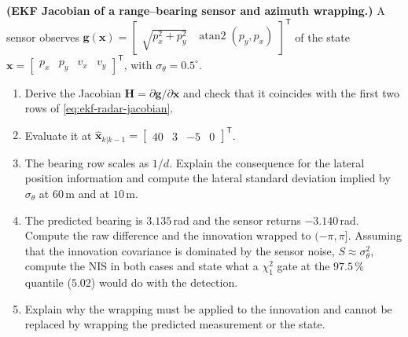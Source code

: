 \documentclass[graybox,envcountchap]{style/SNmono}
\begin{document}
\begin{prob}\label{prob:ch03:5}
\textbf{(EKF Jacobian of a range--bearing sensor and azimuth wrapping.)} A sensor observes $\mathbf{g}(\mathbf{x})=\begin{bmatrix}\sqrt{p_x^{2}+p_y^{2}} & \operatorname{atan2}(p_y,p_x)\end{bmatrix}^{\mathsf T}$ of the state $\mathbf{x}=\begin{bmatrix}p_x&p_y&v_x&v_y\end{bmatrix}^{\mathsf T}$, with $\sigma_\theta=0.5^{\circ}$.
\begin{enumerate}
\item[(a)] Derive the Jacobian $\mathbf{H}=\partial\mathbf{g}/\partial\mathbf{x}$ and check that it coincides with the first two rows of \eqref{eq:ekf-radar-jacobian}.
\item[(b)] Evaluate it at $\widehat{\mathbf{x}}_{k|k-1}=\begin{bmatrix}40&3&-5&0\end{bmatrix}^{\mathsf T}$.
\item[(c)] The bearing row scales as $1/d$. Explain the consequence for the lateral position information and compute the lateral standard deviation implied by $\sigma_\theta$ at $60$\,m and at $10$\,m.
\item[(d)] The predicted bearing is $3.135$\,rad and the sensor returns $-3.140$\,rad. Compute the raw difference and the innovation wrapped to $(-\pi,\pi]$. Assuming that the innovation covariance is dominated by the sensor noise, $S\approx\sigma_\theta^{2}$, compute the NIS in both cases and state what a $\chi^{2}_{1}$ gate at the $97.5\,\%$ quantile ($5.02$) would do with the detection.
\item[(e)] Explain why the wrapping must be applied to the innovation and cannot be replaced by wrapping the predicted measurement or the state.
\end{enumerate}
\end{prob}
\end{document}
